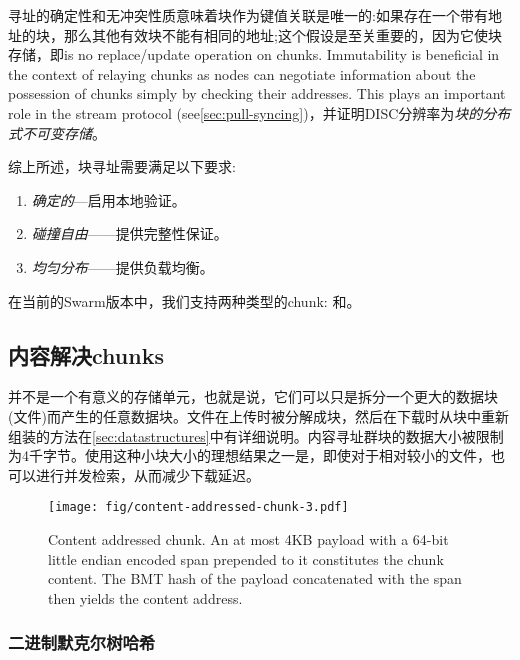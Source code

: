 寻址的确定性和无冲突性质意味着块作为键值关联是唯一的:如果存在一个带有地址的块，那么其他有效块不能有相同的地址;这个假设是至关重要的，因为它使块存储，即\there is no replace/update operation on chunks. Immutability is beneficial in the context of relaying chunks as nodes can negotiate information about the possession of chunks simply by checking their addresses. This plays an important role in the stream protocol (see\ref{sec:pull-syncing})，并证明DISC分辨率为\emph{块的分布式不可变存储}。

综上所述，块寻址需要满足以下要求:

\begin{enumerate}
    \item \emph{确定的}—启用本地验证。
    \item \emph{碰撞自由}——提供完整性保证。
    \item \emph{均匀分布}——提供负载均衡。
\end{enumerate}

在当前的Swarm版本中，我们支持两种类型的chunk: 和。 

\subsection{内容解决chunks\statusgreen}\label{sec:content-addressed-chunks}

并不是一个有意义的存储单元，也就是说，它们可以只是拆分一个更大的数据块(文件)而产生的任意数据块。文件在上传时被分解成块，然后在下载时从块中重新组装的方法在\ref{sec:datastructures}中有详细说明。内容寻址群块的数据大小被限制为4千字节。使用这种小块大小的理想结果之一是，即使对于相对较小的文件，也可以进行并发检索，从而减少下载延迟。 

\begin{figure}[htbp]
   \centering
   \texttt{[image: fig/content-addressed-chunk-3.pdf]}
   \caption[Content addressed chunk\statusgreen]{Content addressed chunk. An at most 4KB payload with a 64-bit little endian encoded span prepended to it constitutes the chunk content. The BMT hash of the payload concatenated with the span then yields the content address.}
   \label{fig:content-addressed-chunk}
\end{figure}

\subsubsection{二进制默克尔树哈希}

